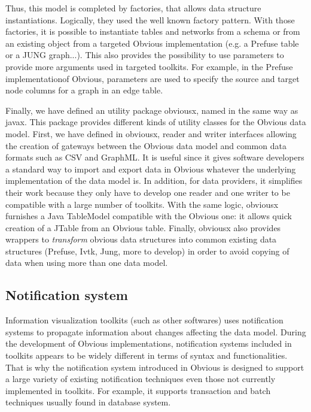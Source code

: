 Thus, this model is completed by factories, that allows data structure instantiations. Logically, they used the well known factory pattern. With those factories, it is possible to instantiate tables and networks from a schema or from an existing object from a targeted Obvious implementation (e.g. a Prefuse table or a JUNG graph...). This also provides the possibility to use parameters to provide more arguments used in targeted toolkits. For example, in the Prefuse implementationof Obvious, parameters are used to specify the source and target node columns for a graph in an edge table.

Finally, we have defined an utility package obviousx, named in the same way as javax. This package provides different kinds of utility classes for the Obvious data model. First, we have defined in obviousx, reader and writer interfaces allowing the creation of gateways between the Obvious data model and common data formats such as CSV and GraphML. It is useful since it gives software developers a standard way to import and export data in Obvious whatever the underlying implementation of the data model is. In addition, for data providers, it simplifies their work because they only have to develop one reader and one writer to be compatible with a large number of toolkits. With the same logic, obviousx furnishes a Java TableModel compatible with the Obvious one: it allows quick creation of a JTable from an Obvious
table. Finally, obviousx also provides wrappers to \emph{transform} obvious data structures into common existing data structures (Prefuse, Ivtk, Jung, more to develop) in order to avoid copying of data when using more than one data model.
 
\subsection{Notification system}

Information visualization toolkits (such as other softwares) uses notification systems to propagate information about changes affecting the data model. During the development of Obvious implementations, notification systems included in toolkits appears to be widely different in terms of syntax and functionalities. That is why the notification system introduced in Obvious is designed to support a large variety of existing notification techniques even those not currently implemented in toolkits. For example, it supports transaction and batch techniques usually found in database system.

